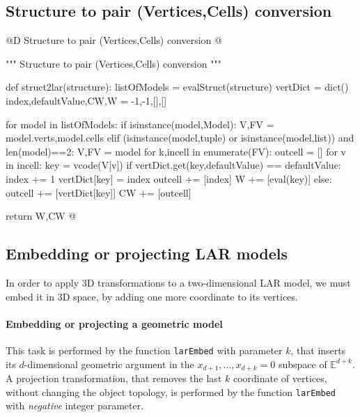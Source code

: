 \documentclass[11pt,oneside]{article}    %
\def\E{\mathbb{E}}
\begin{document}
\subsection{Structure to pair (Vertices,Cells) conversion}
@D Structure to pair (Vertices,Cells) conversion
@{""" Structure to pair (Vertices,Cells) conversion """

def struct2lar(structure):
    listOfModels = evalStruct(structure)
    vertDict = dict()
    index,defaultValue,CW,W = -1,-1,[],[]
        
    for model in listOfModels:
        if isinstance(model,Model):
            V,FV = model.verts,model.cells
        elif (isinstance(model,tuple) or isinstance(model,list)) and len(model)==2:
            V,FV = model
        for k,incell in enumerate(FV):
            outcell = []
            for v in incell:
                key = vcode(V[v])
                if vertDict.get(key,defaultValue) == defaultValue:
                    index += 1
                    vertDict[key] = index
                    outcell += [index]
                    W += [eval(key)]
                else: 
                    outcell += [vertDict[key]]
            CW += [outcell]
            
    return W,CW
@}
\subsection{Embedding or projecting LAR models}

In order to apply 3D transformations to a two-dimensional LAR model, we must embed it in 3D space, by adding one more coordinate to its vertices. 

\paragraph{Embedding or projecting a geometric model}

This task is performed by the function \texttt{larEmbed} with parameter $k$, that inserts its $d$-dimensional geometric argument in the $x_{d+1}, \ldots, x_{d+k}=0$ subspace of $\E^{d+k}$.
A projection transformation, that removes the last $k$ coordinate of vertices, without changing the object topology, is performed by the function \texttt{larEmbed} with \emph{negative} integer parameter.
\end{document}
